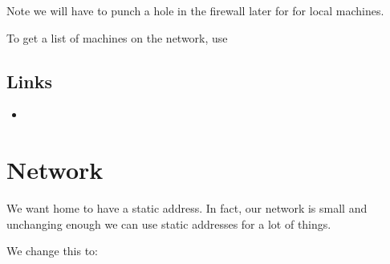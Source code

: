 \documentclass[a4paper,10pt,english]{sphinxmanual}
\begin{document}
Note we will have to punch a hole in the firewall later for  for
local machines.

To get a list of machines on the network, use

\begin{sphinxVerbatim}[commandchars=\\\{\}]
 
\end{sphinxVerbatim}


\subsection{Links}
\label{\detokenize{services:links}}\begin{itemize}
\item {} 

\end{itemize}


\section{Network}
\label{\detokenize{services:network}}
We want home to have a static address. In fact, our network is small and
unchanging enough we can use static addresses for a lot of things.

\begin{sphinxVerbatim}[commandchars=\\\{\}]
  
\end{sphinxVerbatim}

We change this to:

\begin{sphinxVerbatim}[commandchars=\\\{\}]
             \PYG{p}{[}\PYG{p}{]}
             
               \PYG{p}{[}\PYG{p}{]}
             
             
             
             
     
\end{sphinxVerbatim}
\end{document}
